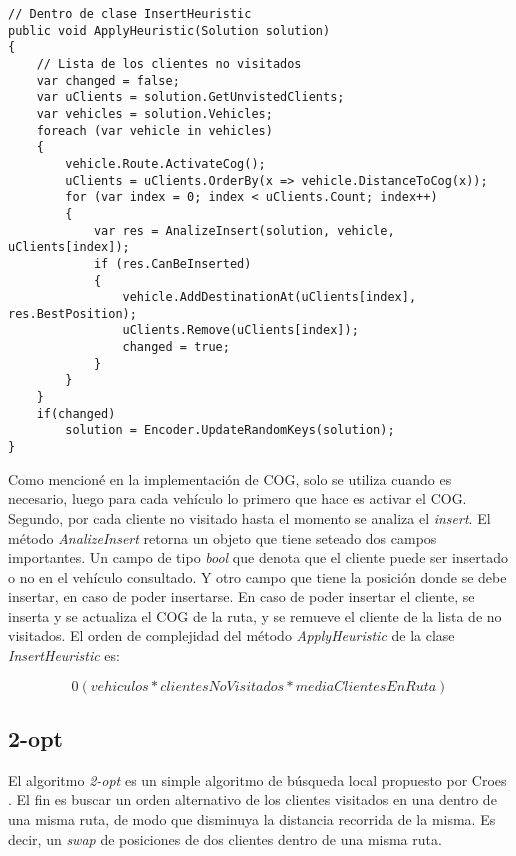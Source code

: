 \begin{minipage}{\textwidth}
\begin{lstlisting}
// Dentro de clase InsertHeuristic
public void ApplyHeuristic(Solution solution)
{
	// Lista de los clientes no visitados
	var changed = false;	
	var uClients = solution.GetUnvistedClients;	
	var vehicles = solution.Vehicles;
	foreach (var vehicle in vehicles)
	{
		vehicle.Route.ActivateCog();
		uClients = uClients.OrderBy(x => vehicle.DistanceToCog(x));	
		for (var index = 0; index < uClients.Count; index++)
		{
			var res = AnalizeInsert(solution, vehicle, uClients[index]);
			if (res.CanBeInserted)
			{
				vehicle.AddDestinationAt(uClients[index], res.BestPosition);
				uClients.Remove(uClients[index]);
				changed = true;
			}
		}
	}
	if(changed)
		solution = Encoder.UpdateRandomKeys(solution);
}
\end{lstlisting}
\end{minipage}

\bigskip

Como mencioné en la implementación de COG, solo se utiliza cuando es necesario, luego para cada vehículo lo primero que hace es activar el COG. Segundo, por cada cliente no visitado hasta el momento se analiza el \textit{insert}. El método \textit{AnalizeInsert} retorna un objeto que tiene seteado dos campos importantes. Un campo de tipo \textit{bool} que denota que el cliente puede ser insertado o no en el vehículo consultado. Y otro campo que tiene la posición donde se debe insertar, en caso de poder insertarse. En caso de poder insertar el cliente, se inserta y se actualiza el COG de la ruta, y se remueve el cliente de la lista de no visitados. El orden de complejidad del método \textit{ApplyHeuristic} de la clase \textit{InsertHeuristic} es: 

\begin{equation*}
0(vehiculos * clientesNoVisitados * mediaClientesEnRuta)
\end{equation*}

\subsection{2-opt}

El algoritmo \textit{2-opt} es un simple algoritmo de búsqueda local propuesto por Croes \cite{Croes}. El fin es buscar un orden alternativo de los clientes visitados en una dentro de una misma ruta, de modo que disminuya la distancia recorrida de la misma. Es decir, un \textit{swap} de posiciones de dos clientes dentro de una misma ruta.

